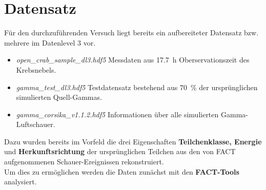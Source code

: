 \section{Datensatz}
Für den durchzuführenden Versuch liegt bereits ein aufbereiteter Datensatz bzw. mehrere im Datenlevel 3 vor.
\begin{itemize}
	\item \textit{open\_crab\_sample\_dl3.hdf5} Messdaten aus \SI{17.7}{\hour} Oberservationszeit des Krebsnebels.
	\item \textit{gamma\_test\_dl3.hdf5} Testdatensatz bestehend aus \SI{70}{\percent} der ursprünglichen simulierten Quell-Gammas.
	\item \textit{gamma\_corsika\_v1.1.2.hdf5} Informationen über alle simulierten Gamma-Luftschauer.
\end{itemize}
Dazu wurden bereits im Vorfeld die drei Eigenschaften \textbf{Teilchenklasse, Energie} und \textbf{Herkunftsrichtung} der ursprünglichen Teilchen aus den von FACT aufgenommenen Schauer-Ereignissen rekonstruiert. \\
Um dies zu ermöglichen werden die Daten zunächst mit den \textbf{FACT-Tools} \cite{kai_brugge_2018_2386762} analysiert. 
